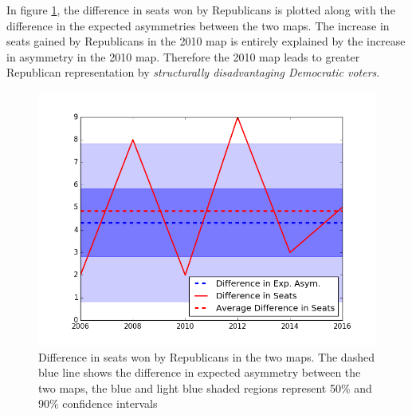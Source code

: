 \documentclass[preprint,12pt]{article}
\begin{document}
In figure \ref{fig:Asym20002010diff}, the difference in seats won by Republicans is plotted along with the difference in the expected asymmetries between the two maps.
The increase in seats gained by Republicans in the 2010 map is entirely explained by the increase in asymmetry in the 2010 map.
Therefore the 2010 map leads to greater Republican representation by \emph{structurally disadvantaging Democratic voters}.


\begin{figure}[htb!]
    \begin{center}
        \includegraphics[scale=0.85]{../Figures/WI2010/WI_2000_2010diff.png}
        \caption{Difference in seats won by Republicans in the two maps. The dashed blue line shows the difference in expected asymmetry between the two maps, the blue and light blue shaded regions represent 50\% and 90\% confidence intervals}\label{fig:Asym20002010diff}
    \end{center}
\end{figure}
\end{document}
